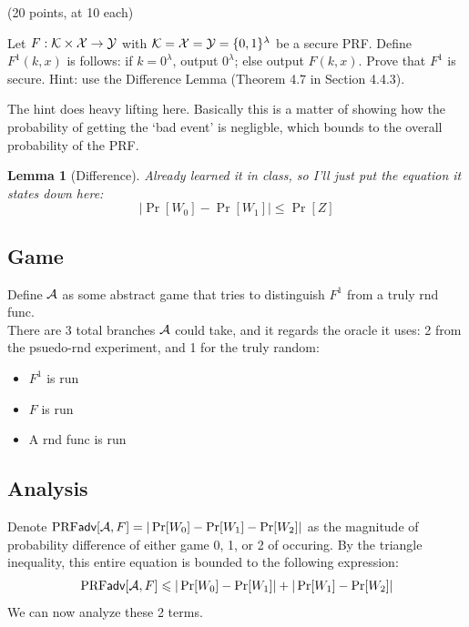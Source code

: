 \documentclass[12pt]{article}
\theoremstyle{plain}
\newtheorem{lemma}{Lemma}
\theoremstyle{definition}
\begin{document}
\begin{problem} (20 points, at 10 each)

\begin{ppart}
  Let $F:\mathcal{K}\times \mathcal{X} \rightarrow \mathcal{Y}$ with $\mathcal{K}=\mathcal{X}=\mathcal{Y}=\{0,1\}^\lambda$ be a secure PRF. Define $F^1(k, x)$ is follows: if $k=0^\lambda$, output $0^\lambda$; else output $F(k, x)$. Prove that $F^1$ is secure. Hint: use the Difference Lemma (Theorem 4.7 in Section 4.4.3).
\end{ppart}

\begin{solution}
The hint does heavy lifting here. Basically this is a matter of showing how the probability of getting the `bad event' is negligble, which bounds to the overall probability of the PRF.

\begin{lemma}[Difference]\label{lemma:difference}
  Already learned it in class, so I'll just put the equation it states down here:
  \begin{equation*}
    |\Pr[W_0] - \Pr[W_1]| \leq \Pr[Z]
  \end{equation*}
\end{lemma}

\subsection*{Game}
  Define $\mathcal{A}$ as some abstract game that tries to distinguish $F^1$ from a truly rnd func.\\
  
  \noindent There are 3 total branches $\mathcal{A}$ could take, and it regards the oracle it uses:
  2 from the psuedo-rnd experiment, and 1 for the truly random:
  
  \begin{itemize}
    \item[Game 0] $F^1$ is run
    \item[Game 1] $F$ is run
    \item[Game 2] A rnd func is run  
  \end{itemize}

\subsection*{Analysis}
Denote $\textrm{PRF}\textsf{adv}[\mathcal{A}, F] = |\Pr[W_0] - \Pr[W_1] - \Pr[W_2]|$ as the magnitude of probability difference of either game 0, 1, or 2 of occuring. By the triangle inequality,
this entire equation is bounded to the following expression:
\begin{equation*}
  \textrm{PRF}\textsf{adv}[\mathcal{A}, F] \leqslant |\Pr[W_0] - \Pr[W_1]| + |\Pr[W_1] - \Pr[W_2]|
\end{equation*}
\noindent We can now analyze these 2 terms.


\end{solution}
\end{problem}
\end{document}
